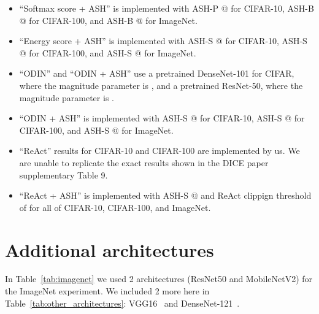 \documentclass{article}
\newcommand{\tabref}[1]{Table~\ref{tab:#1}}
\begin{document}
\begin{itemize}
    \item ``Softmax score + ASH'' is implemented with ASH-P @  for CIFAR-10, ASH-B @  for CIFAR-100, and ASH-B @  for ImageNet.
    \item ``Energy score + ASH'' is implemented with ASH-S @  for CIFAR-10, ASH-S @  for CIFAR-100, and ASH-S @  for ImageNet.
    \item ``ODIN'' and ``ODIN + ASH'' use a pretrained DenseNet-101 for CIFAR, where the magnitude parameter is , and a pretrained ResNet-50, where the magnitude parameter is .
    \item ``ODIN + ASH'' is implemented with ASH-S @  for CIFAR-10, ASH-S @  for CIFAR-100, and ASH-S @  for ImageNet.
    \item ``ReAct'' results for CIFAR-10 and CIFAR-100 are implemented by us. We are unable to replicate the exact results shown in the DICE paper supplementary Table 9.
    \item ``ReAct + ASH'' is implemented with ASH-S @  and ReAct clippign threshold of  for all of CIFAR-10, CIFAR-100, and ImageNet.
\end{itemize}

\section{Additional architectures}
In \tabref{imagenet} we used 2 architectures (ResNet50 and MobileNetV2) for the ImageNet experiment. We included 2 more here in \tabref{other_architectures}: VGG16~\citep{simonyan2014very} and DenseNet-121~\citep{huang2017densely}.
\end{document}
